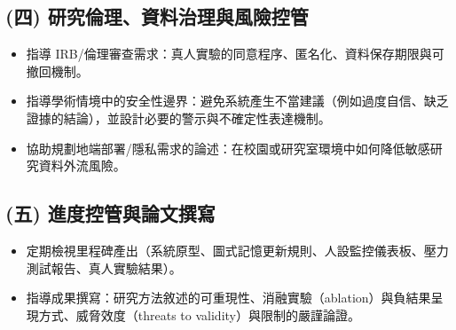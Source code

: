\subsection*{(四) 研究倫理、資料治理與風險控管}
\begin{itemize}
  \item 指導 IRB/倫理審查需求：真人實驗的同意程序、匿名化、資料保存期限與可撤回機制。
  \item 指導學術情境中的安全性邊界：避免系統產生不當建議（例如過度自信、缺乏證據的結論），並設計必要的警示與不確定性表達機制。
  \item 協助規劃地端部署/隱私需求的論述：在校園或研究室環境中如何降低敏感研究資料外流風險。
\end{itemize}

\subsection*{(五) 進度控管與論文撰寫}
\begin{itemize}
  \item 定期檢視里程碑產出（系統原型、圖式記憶更新規則、人設監控儀表板、壓力測試報告、真人實驗結果）。
  \item 指導成果撰寫：研究方法敘述的可重現性、消融實驗（ablation）與負結果呈現方式、威脅效度（threats to validity）與限制的嚴謹論證。
\end{itemize}

